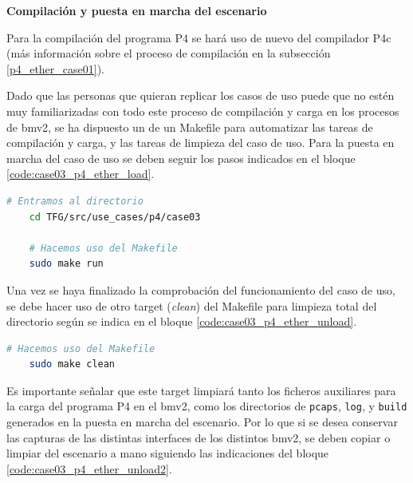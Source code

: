 \vspace{1cm}
\textbf{Compilación y puesta en marcha del escenario}\\
\par

Para la compilación del programa P4 se hará uso de nuevo del compilador P4c (más información sobre el proceso de compilación en la subsección \ref{p4_ether_case01}).\\
\par

Dado que las personas que quieran replicar los casos de uso puede que no estén muy familiarizadas con todo este proceso de compilación y carga en los procesos de \gls{bmv2}, se ha dispuesto un de un Makefile para automatizar las tareas de compilación y carga, y las tareas de limpieza del caso de uso. Para la puesta en marcha del caso de uso se deben seguir los pasos indicados en el bloque \ref{code:case03_p4_ether_load}.\\
\par

\begin{lstlisting}[language= bash, style=Consola, caption={Compilación programa P4 y puesta en marcha del escenario - Case03},label=code:case03_p4_ether_load]
    # Entramos al directorio 
    cd TFG/src/use_cases/p4/case03

    # Hacemos uso del Makefile
    sudo make run
\end{lstlisting}
\vspace{0.5cm}

Una vez se haya finalizado la comprobación del funcionamiento del caso de uso, se debe hacer uso de otro target (\textit{clean}) del Makefile para limpieza total del directorio según se indica en el bloque \ref{code:case03_p4_ether_unload}.

\begin{lstlisting}[language= bash, style=Consola, caption={Limpieza del escenario P4 - Case03},label=code:case03_p4_ether_unload]
    # Hacemos uso del Makefile
    sudo make clean
\end{lstlisting}
\vspace{0.5cm}

Es importante señalar que este target limpiará tanto los ficheros auxiliares para la carga del programa P4 en el \gls{bmv2}, como los directorios de \texttt{pcaps}, \texttt{log}, y \texttt{build} generados en la puesta en marcha del escenario. Por lo que si se desea conservar las capturas de las distintas interfaces de los distintos \gls{bmv2}, se deben copiar o limpiar del escenario a mano siguiendo las indicaciones del bloque \ref{code:case03_p4_ether_unload2}.\\
\par

